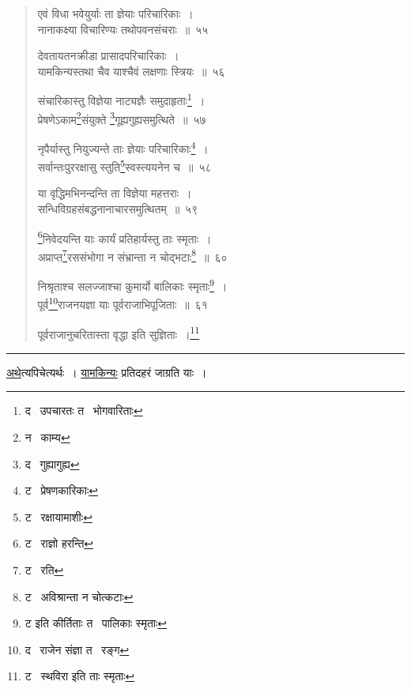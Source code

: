 \documentclass[11pt, openany]{book}
\begin{document}
\begin{quote}
{\na एवं विधा भवेयुर्याः ता ज्ञेयाः परिचारिकाः~।\\
नानाकक्ष्या विचारिण्यः तथोपवनसंचराः~॥~५५

देवतायतनक्रीडा प्रासादपरिचारिकाः~।\\
यामकिन्यस्तथा चैव याश्चैवं लक्षणाः स्त्रियः~॥~५६

संचारिकास्तु विज्ञेया नाट्यज्ञैः समुदाहृताः\renewcommand{\thefootnote}{1}\footnote{द \textendash\  उपचारतः त \textendash\  भोगवारिताः}~।\\
प्रेषणेऽकाम\renewcommand{\thefootnote}{2}\footnote{न \textendash\  काम्य}संयुक्ते \renewcommand{\thefootnote}{3}\footnote{द \textendash\  गुह्यागुह्य}गूह्यगुह्यसमुत्थिते~॥~५७

नृपैर्यास्तु नियुज्यन्ते ताः ज्ञेयाः परिचारिकाः\renewcommand{\thefootnote}{4}\footnote{ट \textendash\  प्रेषणकारिकाः}~।\\
सर्वान्तःपुररक्षासु स्तुति\renewcommand{\thefootnote}{5}\footnote{ट \textendash\  रक्षायामाशीः}स्वस्त्ययनेन च~॥~५८

या वृद्धिमभिनन्दन्ति ता विज्ञेया महत्तराः~।\\
सन्धिविग्रहसंबद्धनानाचारसमुत्थितम्~॥~५९

\renewcommand{\thefootnote}{6}\footnote{ट \textendash\  राज्ञो हरन्ति}निवेदयन्ति याः कार्यं प्रतिहार्यस्तु ताः स्मृताः~।\\
अप्राप्त\renewcommand{\thefootnote}{7}\footnote{ट \textendash\  रति}रससंभोगा न संभ्रान्ता न चोद्भटाः\renewcommand{\thefootnote}{8}\footnote{ट \textendash\  अविश्रान्ता न चोत्कटाः}~॥~६०

निश्रृताश्च सलज्जाश्चा कुमार्यो बालिकाः स्मृताः\renewcommand{\thefootnote}{9}\footnote{ट इति कीर्तिताः त \textendash\  पालिकाः स्मृताः}~।\\
पूर्व\renewcommand{\thefootnote}{10}\footnote{द \textendash\  राजेन संज्ञा त \textendash\  रङ्ग}राजनयज्ञा याः पूर्वराजाभिपूजिताः~॥~६१

पूर्वराजानुचरितास्ता वृद्धा इति सुज्ञिताः~।\renewcommand{\thefootnote}{11}\footnote{ट \textendash\  स्थविरा इति ताः स्मृताः}}
\end{quote}

\hrule

\vspace{2mm}
\noindent
\underline{अथे}त्यपिचेत्यर्थः~। \underline{यामकिन्यः} प्रतिदहरं जाग्रति याः~।


\newpage
\lfoot{}
\end{document}
